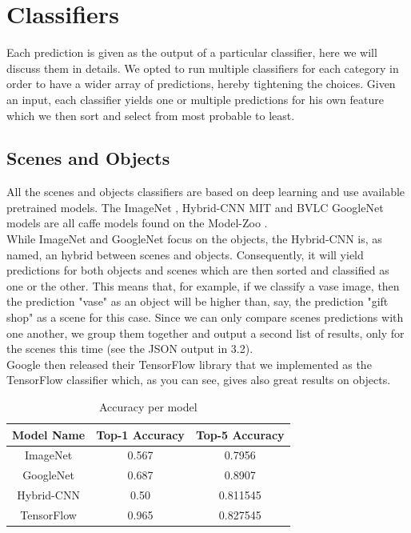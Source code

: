 \documentclass{article}
\begin{document}
\section{Classifiers}
    Each prediction is given as the output of a particular classifier, here we will discuss them in details. We opted to run multiple classifiers for each category in order to have a wider array of predictions, hereby tightening the choices. Given an input, each classifier yields one or multiple predictions for his own feature which we then sort and select from most probable to least.
    \subsection{Scenes and Objects}
        All the scenes and objects classifiers are based on deep learning and use available pretrained models.
        The ImageNet \cite{imnet}, Hybrid-CNN MIT \cite{hybrid} and BVLC GoogleNet models are all caffe models found on the Model-Zoo \cite{zoo}. 
        \\While ImageNet and GoogleNet focus on the objects, the Hybrid-CNN is, as named, an hybrid between scenes and objects. Consequently, it will yield predictions for both objects and scenes which are then sorted and classified as one or the other. This means that, for example, if we classify a vase image, then the prediction "vase" as an object will be higher than, say, the prediction "gift shop" as a scene for this case. Since we can only compare scenes predictions with one another, we group them together and output a second list of results, only for the scenes this time (see the JSON output in 3.2).
        \\Google then released their TensorFlow \cite{tensor} library that we implemented as the TensorFlow classifier which, as you can see, gives also great results on objects.
        \begin{table}[h!]
          \centering
            \begin{tabular}{|c | c | c |}
            \hline
            Model Name & Top-1 Accuracy & Top-5 Accuracy \\ [0.5ex] 
            \hline\hline
            ImageNet & 0.567 & 0.7956\\ 
            \hline
            GoogleNet & 0.687 & 0.8907\\
            \hline
            Hybrid-CNN & 0.50 & 0.811545\\
            \hline
            TensorFlow & 0.965 & 0.827545\\[1ex] 
            \hline
            \end{tabular}
          \caption {Accuracy per model \cite{imac} \cite{hybac} \cite{tenac}}
        \end{table}
\end{document}
